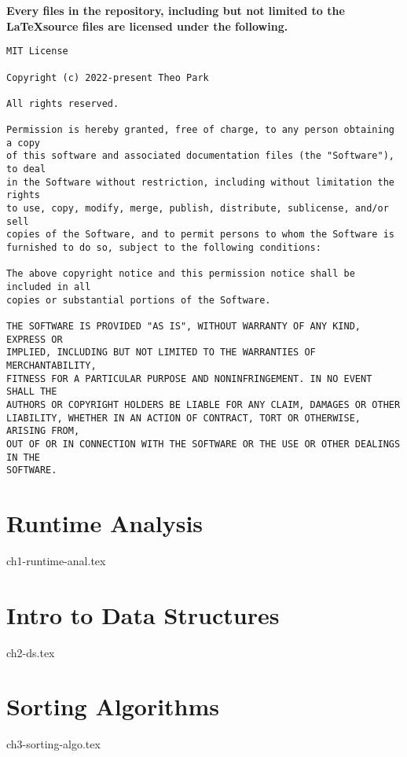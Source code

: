 \documentclass{report}
\begin{document}
\noindent \textbf{Every files in the repository, including but not limited to the \LaTeX source files are licensed under the following.}
\begin{verbatim}
MIT License

Copyright (c) 2022-present Theo Park

All rights reserved.

Permission is hereby granted, free of charge, to any person obtaining a copy
of this software and associated documentation files (the "Software"), to deal
in the Software without restriction, including without limitation the rights
to use, copy, modify, merge, publish, distribute, sublicense, and/or sell
copies of the Software, and to permit persons to whom the Software is
furnished to do so, subject to the following conditions:

The above copyright notice and this permission notice shall be included in all
copies or substantial portions of the Software.

THE SOFTWARE IS PROVIDED "AS IS", WITHOUT WARRANTY OF ANY KIND, EXPRESS OR
IMPLIED, INCLUDING BUT NOT LIMITED TO THE WARRANTIES OF MERCHANTABILITY,
FITNESS FOR A PARTICULAR PURPOSE AND NONINFRINGEMENT. IN NO EVENT SHALL THE
AUTHORS OR COPYRIGHT HOLDERS BE LIABLE FOR ANY CLAIM, DAMAGES OR OTHER
LIABILITY, WHETHER IN AN ACTION OF CONTRACT, TORT OR OTHERWISE, ARISING FROM,
OUT OF OR IN CONNECTION WITH THE SOFTWARE OR THE USE OR OTHER DEALINGS IN THE
SOFTWARE.
\end{verbatim}


\chapter{Runtime Analysis}
{ch1-runtime-anal.tex}


\chapter{Intro to Data Structures}
{ch2-ds.tex}


\chapter{Sorting Algorithms}
{ch3-sorting-algo.tex}

\end{document}
